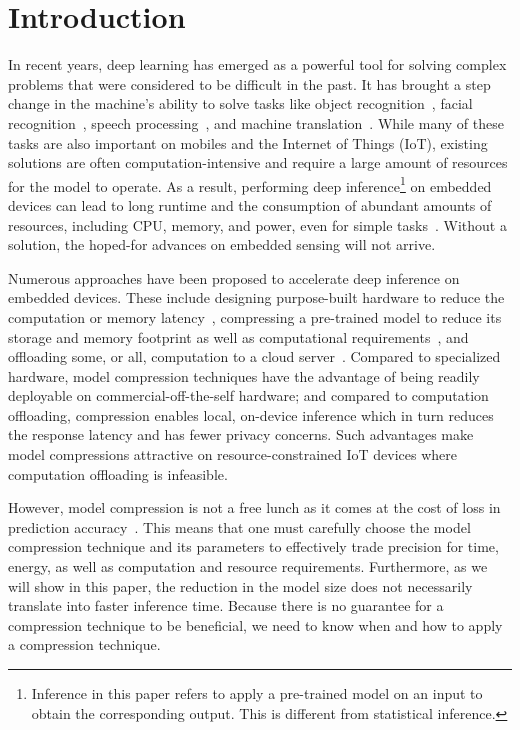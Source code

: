 \section{Introduction}
In recent years, deep learning has emerged as a powerful tool for solving complex problems that were considered to be difficult in the
past. It has brought a step change in the machine's ability to solve tasks like object recognition~\cite{donahue14,he2016deep}, facial
recognition~\cite{parkhi2015deep,sun2014deep}, speech processing~\cite{pmlrv48amodei16}, and machine translation~\cite{bahdanau2014neural}.
While many of these tasks are also important on mobiles and the Internet of Things (IoT), existing solutions are often
computation-intensive and require a large amount of resources for the model to operate. As a result, performing deep
inference\footnote{Inference in this paper refers to apply a pre-trained model on an input to obtain the corresponding output. This is
different from statistical inference.} on embedded devices can lead to long runtime and the consumption of abundant amounts of resources,
including CPU, memory, and power, even for simple tasks~\cite{CanzianiPC16}. Without a solution,
 the hoped-for advances on embedded sensing will not arrive.


Numerous approaches have been proposed to accelerate deep inference on embedded devices. These include designing purpose-built hardware to
reduce the computation or memory latency~\cite{georgiev2017low}, compressing a pre-trained model to reduce its storage and memory footprint
as well as computational requirements~\cite{Han:2016:EEI:3001136.3001163}, and offloading some, or all, computation to a cloud
server~\cite{Kang2017neurosurgeon,teerapittayanon2017distributed}. Compared to specialized hardware, model compression techniques have the
advantage of being readily deployable on commercial-off-the-self hardware; and compared to computation offloading, compression enables
local, on-device inference which in turn reduces the response latency and has fewer privacy concerns. Such advantages make model
compressions attractive on resource-constrained IoT devices where computation offloading is infeasible.


However, model compression is not a free lunch as it comes at the cost of loss in prediction accuracy~\cite{Cheng2017A}. This means that
one must carefully choose the model compression technique and its parameters to effectively trade precision for time, energy, as well as
computation and resource requirements. Furthermore, as we will show in this paper, the reduction in the model size does not necessarily
translate into faster inference time. Because there is no guarantee for a compression technique to be beneficial, we need to know when and
how to apply a compression technique.

